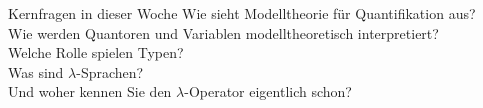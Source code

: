 \begin{frame}
  {Kernfragen in dieser Woche}
  \onslide<+->
  \onslide<+->
  \centering 
  \Large
  Wie sieht \alert{Modelltheorie} für Quantifikation aus?\\
  Wie werden Quantoren und Variablen modelltheoretisch interpretiert?\\
  \onslide<+->
  \Halbzeile
  Welche Rolle spielen \alert{Typen}?\\
  \onslide<+->
  \Halbzeile
  Was sind \alert{$\lambda$-Sprachen?}\\
  Und woher kennen Sie den $\lambda$-Operator eigentlich schon?\\
  \onslide<+->
  \Halbzeile
\end{frame}

